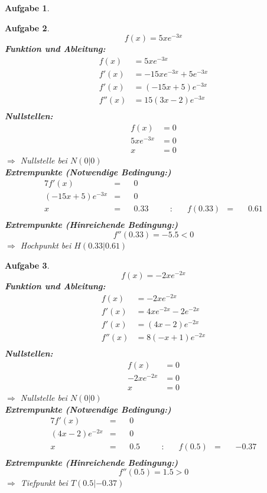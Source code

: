 \documentclass[12pt]{article}
\theoremstyle{note}
\newtheorem{aufgabe}{Aufgabe}
\begin{document}
\begin{flushleft}
\begin{aufgabe}
\end{aufgabe}\clearpage\begin{aufgabe} ~  
$$f(x)=5 x e^{- 3 x}$$ 
{\bf Funktion und Ableitung:} 
\begin{align*} 
f(x)&=5 x e^{- 3 x}\\ 
f'(x)&=- 15 x e^{- 3 x} + 5 e^{- 3 x}\\ 
f'(x)&=\left(- 15 x + 5\right) e^{- 3 x}\\ 
f''(x)&=15 \left(3 x - 2\right) e^{- 3 x}\\ 
\end{align*} 
{\bf Nullstellen:} 
\begin{align*} 
f(x)&=0 \\ 
5 x e^{- 3 x}&=0 \\ 
x&=0\end{align*} 
$\Rightarrow$ Nullstelle bei $N(0|0)$ \\ 
{\bf Extrempunkte (Notwendige Bedingung:)} 
\begin{alignat*}{7} 
f'(x)&=& &0& \\ 
\left(- 15 x + 5\right) e^{- 3 x}&=& &0& \\ 
x&=& &0.33& \quad &:& \quad f(0.33)&=& \, &0.61\\ 
\end{alignat*} 
{\bf Extrempunkte (Hinreichende Bedingung:)} 
\\ 
$$f''(0.33)=-5.5< 0 $$ 
$\Rightarrow$ Hochpunkt bei $H(0.33|0.61)$ \\ 

\end{aufgabe}\clearpage\begin{aufgabe} ~  
$$f(x)=- 2 x e^{- 2 x}$$ 
{\bf Funktion und Ableitung:} 
\begin{align*} 
f(x)&=- 2 x e^{- 2 x}\\ 
f'(x)&=4 x e^{- 2 x} - 2 e^{- 2 x}\\ 
f'(x)&=\left(4 x - 2\right) e^{- 2 x}\\ 
f''(x)&=8 \left(- x + 1\right) e^{- 2 x}\\ 
\end{align*} 
{\bf Nullstellen:} 
\begin{align*} 
f(x)&=0 \\ 
- 2 x e^{- 2 x}&=0 \\ 
x&=0\end{align*} 
$\Rightarrow$ Nullstelle bei $N(0|0)$ \\ 
{\bf Extrempunkte (Notwendige Bedingung:)} 
\begin{alignat*}{7} 
f'(x)&=& &0& \\ 
\left(4 x - 2\right) e^{- 2 x}&=& &0& \\ 
x&=& &0.5& \quad &:& \quad f(0.5)&=& \, &-0.37\\ 
\end{alignat*} 
{\bf Extrempunkte (Hinreichende Bedingung:)} 
\\ 
$$f''(0.5)=1.5> 0 $$ 
$\Rightarrow$ Tiefpunkt bei $T(0.5|-0.37)$ \\ 


\end{aufgabe}
\end{flushleft}
\end{document}

